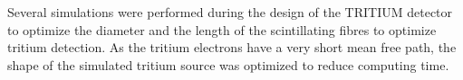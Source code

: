 Several simulations were performed during the design of the TRITIUM detector to optimize the diameter and the length of the scintillating fibres to optimize tritium detection. As the tritium electrons have a very short mean free path, the shape of the simulated tritium source was optimized to reduce computing time. 